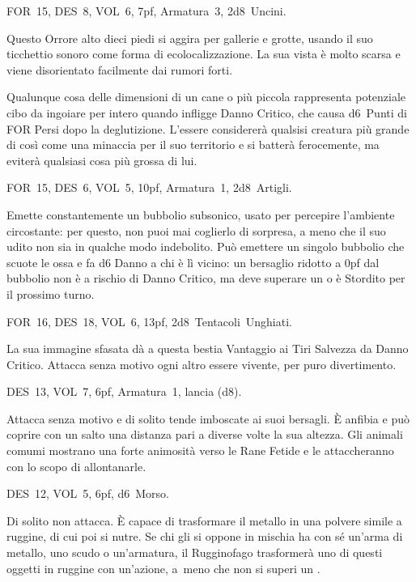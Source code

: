 \documentclass[itdr]{subfiles}
\begin{document}
FOR~15, DES~8, VOL~6, 7pf, Armatura~3, 2d8~Uncini.

Questo Orrore alto dieci piedi si aggira per gallerie e grotte, usando il suo ticchettio sonoro come forma di ecolocalizzazione. La sua vista è molto scarsa e viene disorientato facilmente dai rumori forti.

Qualunque cosa delle dimensioni di un cane o più piccola rappresenta potenziale cibo da ingoiare per intero quando infligge Danno Critico, che causa d6~Punti di FOR Persi dopo la deglutizione. L'essere considererà qualsisi creatura più grande di così come una minaccia per il suo territorio e si batterà ferocemente, ma eviterà qualsiasi cosa più grossa di lui.

\vfill

FOR~15, DES~6, VOL~5, 10pf, Armatura~1, 2d8~Artigli.

Emette constantemente un bubbolio subsonico, usato per percepire l'ambiente circostante: per questo, non puoi mai coglierlo di sorpresa, a meno che il suo udito non sia in qualche modo indebolito.
Può emettere un singolo bubbolio che scuote le ossa e fa d6 Danno a chi è lì vicino: un bersaglio ridotto a 0pf dal bubbolio non è a rischio di Danno Critico, ma deve superare un  o è Stordito per il prossimo turno.

\vfill

FOR~16, DES~18, VOL~6, 13pf, 2d8~Tentacoli~Unghiati.

La sua immagine sfasata dà a questa bestia Vantaggio ai Tiri Salvezza da Danno Critico. Attacca senza motivo ogni altro essere vivente, per puro divertimento.

\vfill

DES~13, VOL~7, 6pf, Armatura~1, lancia (d8).

Attacca senza motivo e di solito tende imboscate ai suoi bersagli. È anfibia e può coprire con un salto una distanza pari a diverse volte la sua altezza. Gli animali comumi mostrano una forte animosità verso le Rane Fetide e le attaccheranno con lo scopo di allontanarle.

\vfill

DES~12, VOL~5, 6pf, d6~Morso.

Di solito non attacca. È capace di trasformare il metallo in una polvere simile a ruggine, di cui poi si nutre. Se chi gli si oppone in mischia ha con sé un'arma di metallo, uno scudo o un'armatura, il Rugginofago trasformerà uno di questi oggetti in ruggine con un'azione, a~meno che non si superi un .
\end{document}
